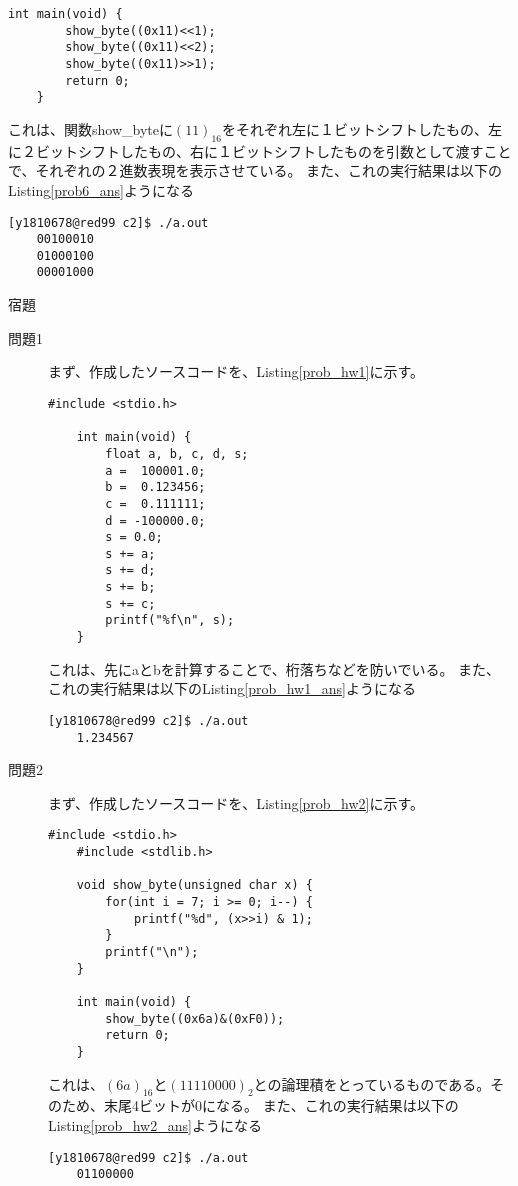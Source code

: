 \documentclass{jsarticle}
\begin{document}
\begin{description}
\begin{lstlisting}[caption=問6のソースコード, label=prob6]
    int main(void) {
        show_byte((0x11)<<1);
        show_byte((0x11)<<2);
        show_byte((0x11)>>1);
        return 0;
    }
    \end{lstlisting}
    これは、関数show\_byteに$(11)_{16}$をそれぞれ左に１ビットシフトしたもの、左に２ビットシフトしたもの、右に１ビットシフトしたものを引数として渡すことで、それぞれの２進数表現を表示させている。
    また、これの実行結果は以下のListing\ref{prob6_ans}ようになる
    \begin{lstlisting}[caption=問6の実行結果, label=prob6_ans]
    [y1810678@red99 c2]$ ./a.out
    00100010
    01000100
    00001000
    \end{lstlisting}
  \end{description}

  \noindent
  \large 宿題
  \begin{description}
    \item[問題1]
    まず、作成したソースコードを、Listing\ref{prob_hw1}に示す。
    \begin{lstlisting}[caption=問1のソースコード, label=prob_hw1]
    #include <stdio.h>

    int main(void) {
        float a, b, c, d, s;
        a =  100001.0;
        b =  0.123456;
        c =  0.111111;
        d = -100000.0;
        s = 0.0;
        s += a;
        s += d;
        s += b;
        s += c;
        printf("%f\n", s);
    }
    \end{lstlisting}
    これは、先にaとbを計算することで、桁落ちなどを防いでいる。
    また、これの実行結果は以下のListing\ref{prob_hw1_ans}ようになる
    \begin{lstlisting}[caption=問1の実行結果, label=prob_hw1_ans]
    [y1810678@red99 c2]$ ./a.out
    1.234567
    \end{lstlisting}

    \item[問題2]
    まず、作成したソースコードを、Listing\ref{prob_hw2}に示す。
    \begin{lstlisting}[caption=問2のソースコード, label=prob_hw2]
    #include <stdio.h>
    #include <stdlib.h>

    void show_byte(unsigned char x) {
        for(int i = 7; i >= 0; i--) {
            printf("%d", (x>>i) & 1);
        }
        printf("\n");
    }

    int main(void) {
        show_byte((0x6a)&(0xF0));
        return 0;
    }
    \end{lstlisting}
    これは、$(6a)_{16}$と$(1111 0000)_{2}$との論理積をとっているものである。そのため、末尾4ビットが0になる。
    また、これの実行結果は以下のListing\ref{prob_hw2_ans}ようになる
    \begin{lstlisting}[caption=問2の実行結果, label=prob_hw2_ans]
    [y1810678@red99 c2]$ ./a.out
    01100000
    \end{lstlisting}

  \end{description}
\end{document}
